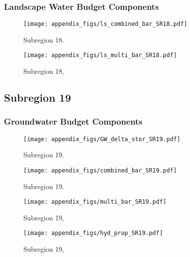 \subsubsection{Landscape Water Budget Components}
\begin{figure}[ht]
\centerline{\texttt{[image: appendix\_figs/ls\_combined\_bar\_SR18.pdf]}}
\caption{\LSCombinedTextOne Subregion 18.\LSCombinedTextTwo}
\label{fig:LS_budget_SR18}
\end{figure}
\newpage

\begin{landscape}
\begin{figure}[ht]
\centerline{\texttt{[image: appendix\_figs/ls\_multi\_bar\_SR18.pdf]}}
\caption{\LSMultiTextOne Subregion 18,\LSMultiTextTwo}
\label{fig:multi_LS_budget_SR18}
\end{figure}
\newpage
\end{landscape}

\subsection{Subregion 19}
\subsubsection{Groundwater Budget Components}
\begin{figure}[h]
\centerline{\texttt{[image: appendix\_figs/GW\_delta\_stor\_SR19.pdf]}}
\caption{\GWBudgetText Subregion 19.}
\label{fig:delta_stor_SR19}
\end{figure}
\newpage

\begin{figure}[ht]
\centerline{\texttt{[image: appendix\_figs/combined\_bar\_SR19.pdf]}}
\caption{\GWCombinedTextOne Subregion 19.\GWCombinedTextTwo}
\label{fig:GW_budget_SR19}
\end{figure}
\newpage

\begin{landscape}
\begin{figure}[ht]
\centerline{\texttt{[image: appendix\_figs/multi\_bar\_SR19.pdf]}}
\caption{\GWMultiTextOne Subregion 19,\GWMultiTextTwo}
\label{fig:multi_GW_budget_SR19}
\end{figure}
\newpage

\begin{figure}[ht]
\centerline{\texttt{[image: appendix\_figs/hyd\_prop\_SR19.pdf]}}
\caption{\HydPropOne Subregion 19,\HydPropTwo}
\label{fig:hyd_prop_SR19}
\end{figure}
\newpage
\end{landscape}

